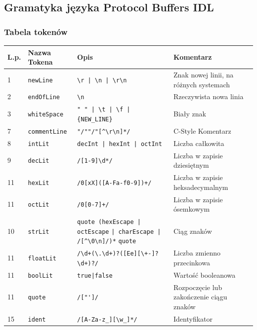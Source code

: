 \documentclass[a4paper]{article}
\begin{document}
 
\subsection{Gramatyka języka Protocol Buffers IDL}
\subsubsection{Tabela tokenów}
\begin{center}
\begin{tabular}{| l | l | p{5cm} | p{5cm} |}
\hline
\textbf{L.p.} &  \textbf{Nazwa Tokena}            & \textbf{Opis}                                 & \textbf{Komentarz} \\ \hline
1    & \verb`newLine`          & \verb`\r | \n | \r\n`                & Znak nowej linii, na różnych systemach \\ \hline
2    & \verb`endOfLine`               & \verb`\n`                            & Rzeczywista nowa linia \\ \hline
3    & \verb`whiteSpace`       & \verb`" " | \t | \f | {NEW_LINE}`    & Biały znak \\ \hline
7    & \verb`commentLine`       & \verb`"/""/"[^\r\n]*/`                & C-Style Komentarz \\ \hline
8    & \verb`intLit`            & \verb`decInt | hexInt | octInt`      & Liczba całkowita \\ \hline
9    & \verb`decLit`            & \verb`/[1-9]\d*/`                    & Liczba w zapisie dziesiętnym \\ \hline
11   & \verb`hexLit`            & \verb`/0[xX]([A-Fa-f0-9])+/`         & Liczba w zapisie heksadecymalnym \\ \hline
11   & \verb`octLit`            & \verb`/0[0-7]+/`                     & Liczba w zapisie ósemkowym \\ \hline
10   & \verb`strLit`            & \verb`quote (hexEscape | octEscape`
                                  \verb`| charEscape | /[^\0\n]/)*`
                                  \verb`quote`                         & Ciąg znaków \\ \hline
11   & \verb`floatLit`          & \verb`/\d+(\.\d+)?([Ee][\+-]?\d+)?/` & Liczba zmienno przecinkowa \\ \hline
11   & \verb`boolLit`           & \verb`true|false`                    & Wartość booleanowa \\ \hline
11   & \verb`quote`             & \verb`/["']/`                        & Rozpoczęcie lub zakończenie ciągu znaków \\ \hline
15   & \verb`ident`             & \verb`/[A-Za-z_][\w_]*/`                &  Identyfikator \\ \hline


\end{tabular}
\end{center}
\end{document}
